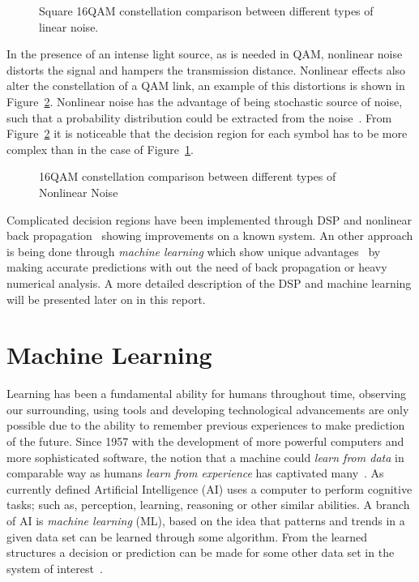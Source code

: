   \begin{figure}[h!]
 \centering
 \caption{Square 16QAM constellation comparison between different types of linear noise. }
 \label{fig:LinerNoise}
\end{figure}
 In the presence of an intense light source, as is needed in QAM, nonlinear noise distorts the signal and hampers the transmission distance. Nonlinear effects also alter the constellation of a QAM link, an example of this distortions is shown in Figure~\ref{fig:NLPNcons}.  Nonlinear noise has the advantage of being stochastic source of noise, such that a probability distribution could be extracted from the noise~\cite{Zibar:12}. From Figure~\ref{fig:NLPNcons} it is noticeable that the decision region for each symbol has to be more complex than in the case of Figure~\ref{fig:LinerNoise}. 


\begin{figure}[h!]
 \centering
{}
  \qquad
 \caption{16QAM constellation comparison between different types of Nonlinear Noise }
 \label{fig:NLPNcons}
\end{figure}
 Complicated decision regions have been implemented through DSP and nonlinear back propagation~\cite{NLPNDSP} showing improvements on a known system. An other approach is being done through \textit{machine learning} which show unique advantages~\cite{Nonparameter,Zibar:12} by making accurate predictions with out the need of back propagation or heavy numerical analysis. A more detailed description of the DSP and machine learning will be presented later on in this report.

% 	
\section{Machine Learning}
%
Learning has been a fundamental ability for humans throughout time, observing our surrounding, using tools and developing technological advancements are only possible due to the ability to remember previous  experiences to make prediction of the future. Since 1957 with the development of more powerful computers and more sophisticated software, the notion that a machine could \emph{learn from data} in comparable way as humans\emph{ learn from experience} has captivated many~\cite{kaplan2019siri}. As currently defined Artificial Intelligence (AI) uses a computer to perform cognitive tasks; such as, perception, learning, reasoning or other similar abilities. A branch of AI is \textit{machine learning} (ML), based on the idea that patterns and trends in a given data set can be learned through some algorithm. From the learned structures a decision or prediction can be made for some other data set in the system of interest~\cite{marsland2014machine}.

